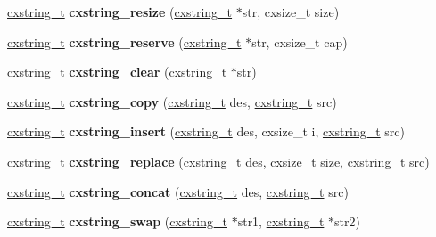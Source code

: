 \begin{DoxyCompactItemize}
\item 
\mbox{\label{a00026_a7343a3c594bfd8dad231453d7dd37aff}} 
\hyperlink{a00072}{cxstring\+\_\+t} {\bfseries cxstring\+\_\+resize} (\hyperlink{a00072}{cxstring\+\_\+t} $\ast$str, cxsize\+\_\+t size)
\item 
\mbox{\label{a00026_a39baecb2e2cf07742bb2b3dadf4990d0}} 
\hyperlink{a00072}{cxstring\+\_\+t} {\bfseries cxstring\+\_\+reserve} (\hyperlink{a00072}{cxstring\+\_\+t} $\ast$str, cxsize\+\_\+t cap)
\item 
\mbox{\label{a00026_ab441e4a21aa272aa037d1ec140195178}} 
\hyperlink{a00072}{cxstring\+\_\+t} {\bfseries cxstring\+\_\+clear} (\hyperlink{a00072}{cxstring\+\_\+t} $\ast$str)
\item 
\mbox{\label{a00026_a634c9663066f29ff9707b8e2d3da2729}} 
\hyperlink{a00072}{cxstring\+\_\+t} {\bfseries cxstring\+\_\+copy} (\hyperlink{a00072}{cxstring\+\_\+t} des, \hyperlink{a00072}{cxstring\+\_\+t} src)
\item 
\mbox{\label{a00026_aeb237db78af114958984c938dba4f98c}} 
\hyperlink{a00072}{cxstring\+\_\+t} {\bfseries cxstring\+\_\+insert} (\hyperlink{a00072}{cxstring\+\_\+t} des, cxsize\+\_\+t i, \hyperlink{a00072}{cxstring\+\_\+t} src)
\item 
\mbox{\label{a00026_a39566cb811f44460e07107e8e99c1a33}} 
\hyperlink{a00072}{cxstring\+\_\+t} {\bfseries cxstring\+\_\+replace} (\hyperlink{a00072}{cxstring\+\_\+t} des, cxsize\+\_\+t size, \hyperlink{a00072}{cxstring\+\_\+t} src)
\item 
\mbox{\label{a00026_ac12a5c56e702611eb7c6006f1b691a38}} 
\hyperlink{a00072}{cxstring\+\_\+t} {\bfseries cxstring\+\_\+concat} (\hyperlink{a00072}{cxstring\+\_\+t} des, \hyperlink{a00072}{cxstring\+\_\+t} src)
\item 
\mbox{\label{a00026_aefa55d1bdf26f9672a87a004a4536ff8}} 
\hyperlink{a00072}{cxstring\+\_\+t} {\bfseries cxstring\+\_\+swap} (\hyperlink{a00072}{cxstring\+\_\+t} $\ast$str1, \hyperlink{a00072}{cxstring\+\_\+t} $\ast$str2)
\item 
\mbox{\label{a00026_ae82b55379c5523b993f2cd0dc35d8aac}} 

\end{DoxyCompactItemize}

